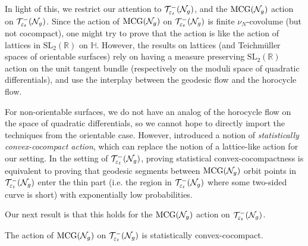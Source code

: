 
In light of this, we restrict our attention to $\mathcal{T}_{\varepsilon_t}^{-}(\mathcal{N}_g)$, and the $\mathrm{MCG}(\mathcal{N}_g)$ action on $\mathcal{T}_{\varepsilon_t}^{-}(\mathcal{N}_g)$.
Since the action of $\mathrm{MCG}(\mathcal{N}_g)$ on $\mathcal{T}_{\varepsilon_t}^{-}(\mathcal{N}_g)$ is finite $\nu_N$-covolume (but not cocompact), one might try to prove that the action is
{like}
the action of lattices in $\mathrm{SL}_2(\mathbb{R})$ on $\mathbb{H}$.
However, the results on lattices (and Teichmüller spaces of orientable surfaces) rely on having a measure preserving $\mathrm{SL}_2(\mathbb{R})$ action on the unit tangent bundle (respectively on the moduli space of quadratic differentials), and use the interplay between the geodesic flow and the horocycle flow.

For non-orientable surfaces, we do not have an analog of the horocycle flow on the space of quadratic differentials, so we cannot hope to directly import the techniques from the orientable case.
However, \textcite{10.1093/imrn/rny001} introduced a notion of \emph{statistically convex-cocompact action}, which can replace the notion of a lattice-like action for our setting.
In the setting of $\mathcal{T}_{\varepsilon_t}^{-}(\mathcal{N}_g)$, proving statistical convex-cocompactness is equivalent to proving that geodesic segments between $\mathrm{MCG}(\mathcal{N}_g)$ orbit points in $\mathcal{T}_{\varepsilon_t}^{-}(\mathcal{N}_g)$ enter the thin part (i.e. the region in $\mathcal{T}_{\varepsilon_t}^{-}(\mathcal{N}_g)$ where some two-sided curve is short) with exponentially low probabilities.

Our next result is that this holds for the $\mathrm{MCG}(\mathcal{N}_g)$ action on $\mathcal{T}_{\varepsilon_t}^{-}(\mathcal{N}_g)$.
\begin{theorem}
  \label{thm:statistical-convex-cocompactness}
  The action of $\mathrm{MCG}(\mathcal{N}_g)$ on $\mathcal{T}_{\varepsilon_t}^{-}(\mathcal{N}_g)$ is statistically convex-cocompact.
\end{theorem}

